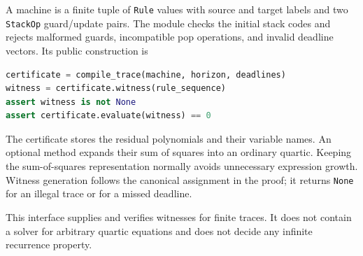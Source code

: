 \documentclass[11pt,letterpaper]{article}
\theoremstyle{definition}
\theoremstyle{remark}
\newcommand{\code}[1]{\texttt{#1}}
\newcommand{\1}{\mathbf 1}
\begin{document}
A machine is a finite tuple of \code{Rule} values with source and target
labels and two \code{StackOp} guard/update pairs. The module checks the
initial stack codes and rejects malformed guards, incompatible pop
operations, and invalid deadline vectors. Its public construction is
\begin{lstlisting}[language=Python]
certificate = compile_trace(machine, horizon, deadlines)
witness = certificate.witness(rule_sequence)
assert witness is not None
assert certificate.evaluate(witness) == 0
\end{lstlisting}
The certificate stores the residual polynomials and their variable names.
An optional method expands their sum of squares into an ordinary quartic. Keeping the sum-of-squares representation normally avoids
unnecessary expression growth. Witness generation follows the canonical
assignment in the proof; it returns \code{None} for an illegal trace or
for a missed deadline.

This interface supplies and verifies witnesses for finite traces. It does
not contain a solver for arbitrary quartic equations and does not decide
any infinite recurrence property.
\end{document}
